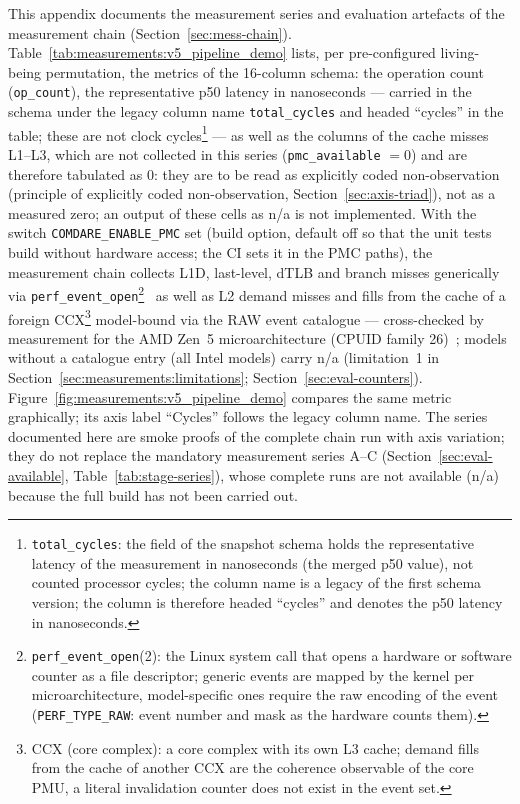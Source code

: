 This appendix documents the measurement series and evaluation artefacts of the measurement chain
(Section~\ref{sec:mess-chain}). Table~\ref{tab:measurements:v5_pipeline_demo} lists, per
pre-configured living-being permutation, the metrics of the 16-column schema: the operation count
(\texttt{op\_count}), the representative p50 latency in nanoseconds --- carried in the schema under
the legacy column name \texttt{total\_cycles} and headed \enquote{cycles} in the table; these are
not clock cycles\footnote{\texttt{total\_cycles}: the field of the snapshot schema holds the
representative latency of the measurement in nanoseconds (the merged p50 value), not counted
processor cycles; the column name is a legacy of the first schema version; the column is therefore
headed \enquote{cycles} and denotes the p50 latency in nanoseconds.} --- as well as the columns of
the cache misses L1--L3, which are not collected in this series (\texttt{pmc\_available} $= 0$) and
are therefore tabulated as 0: they are to be read as explicitly coded non-observation (principle
of explicitly coded non-observation, Section~\ref{sec:axis-triad}), not as a measured zero; an
output of these cells as n/a is not implemented. With the switch
\texttt{COMDARE\_ENABLE\_PMC} set (build option, default off so that the unit tests build without
hardware access; the CI sets it in the PMC paths), the measurement chain collects L1D, last-level,
dTLB and branch misses generically via
\texttt{perf\_event\_open}\footnote{\texttt{perf\_event\_open}(2): the Linux system call that opens a
hardware or software counter as a file descriptor; generic events are mapped by the kernel per
microarchitecture, model-specific ones require the raw encoding of the event
(\texttt{PERF\_TYPE\_RAW}: event number and mask as the hardware counts
them).}~\cite{demelo2010perf} as well as L2 demand misses and fills from the cache of a foreign
CCX\footnote{CCX (core complex): a core complex with its own L3 cache; demand fills from the cache
of another CCX are the coherence observable of the core PMU, a literal invalidation counter does
not exist in the event set.} model-bound via the RAW event catalogue --- cross-checked by
measurement for the AMD Zen~5 microarchitecture (CPUID family
26)~\cite{linux_perf_amdzen5,weaver2008counters}; models without a catalogue entry (all Intel
models) carry n/a (limitation~1 in Section~\ref{sec:measurements:limitations};
Section~\ref{sec:eval-counters}). Figure~\ref{fig:measurements:v5_pipeline_demo} compares the same
metric graphically; its axis label \enquote{Cycles} follows the legacy column name. The series
documented here are smoke proofs of the complete chain run with axis variation; they do not replace
the mandatory measurement series A--C (Section~\ref{sec:eval-available},
Table~\ref{tab:stage-series}), whose complete runs are not available (n/a) because the full build
has not been carried out.


